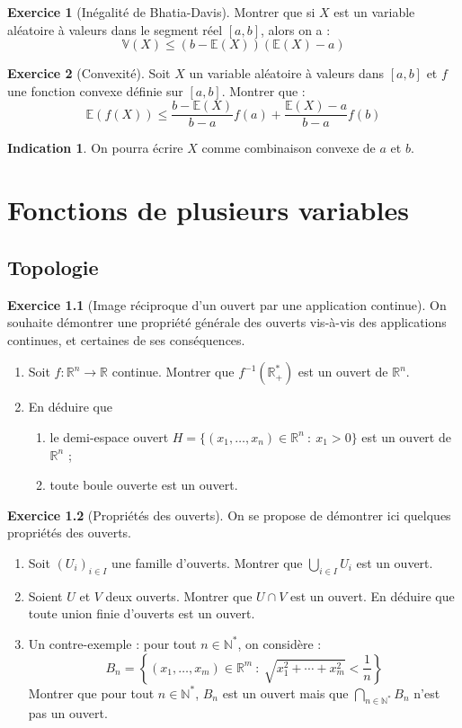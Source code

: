 \documentclass[french]{book}
\newcommand{\N}{\mathbb{N}}
\newcommand{\R}{\mathbb{R}}
\newcommand{\st}{^*}
\newcommand{\inv}{^{-1}}
\newcommand{\E}{\mathbb{E}}
\newcommand{\V}{\mathbb{V}}
\theoremstyle{definition}
\newtheorem{ex}{Exercice}[chapter]
\theoremstyle{theorem}
\newtheorem*{ind}{Indication}
\theoremstyle{remark}
\begin{document}
\begin{ex}[Inégalité de Bhatia-Davis]
	Montrer que si $X$ est un variable aléatoire à valeurs dans le segment réel $[a,b]$, alors on a : $$\V(X)\leqslant (b-\E(X))(\E(X)-a)$$
\end{ex}

\begin{ex}[Convexité]
	Soit $X$ un variable aléatoire à valeurs dans $[a,b]$ et $f$ une fonction convexe définie sur $[a,b]$. Montrer que : $$\E(f(X))\leqslant\frac{b-\E(X)}{b-a}f(a)+\frac{\E(X)-a}{b-a}f(b)$$ \begin{ind}
		On pourra écrire $X$ comme combinaison convexe de $a$ et $b$.
	\end{ind}
\end{ex}



\chapter{Fonctions de plusieurs variables}

\section{Topologie}

\begin{ex}[Image réciproque d'un ouvert par une application continue]
	On souhaite démontrer une propriété générale des ouverts vis-à-vis des applications continues, et certaines de ses conséquences.
	\begin{enumerate}
		\item Soit $f:\R^n\to\R$ continue. Montrer que $f\inv(\R_+\st)$ est un ouvert de $\R^n$.
		\item En déduire que 
		\begin{enumerate}[label=\alph*.]
			\item le demi-espace ouvert $H=\{(x_1,\ldots,x_n)\in\R^n\ : \ x_1>0\}$ est un ouvert de $\R^n$ ; 
			\item toute boule ouverte est un ouvert.
		\end{enumerate}
	\end{enumerate}
\end{ex}

\begin{ex}[Propriétés des ouverts]
	On se propose de démontrer ici quelques propriétés des ouverts.
	\begin{enumerate}
		\item Soit $(U_i)_{i\in I}$ une famille d'ouverts. Montrer que $\displaystyle\bigcup_{i\in I} U_i$ est un ouvert.
		\item Soient $U$ et $V$ deux ouverts. Montrer que $U\cap V$ est un ouvert. En déduire que toute union finie d'ouverts est un ouvert.
		\item Un contre-exemple : pour tout $n\in\N\st$, on considère : $$B_n=\left\{(x_1,\ldots,x_m)\in\R^m\ : \ \sqrt{x_1^2+\cdots+x_m^2}<\frac{1}{n}\right\}$$ Montrer que pour tout $n\in\N\st$, $B_n$ est un ouvert mais que $\displaystyle\bigcap_{n\in\N\st}B_n$ n'est pas un ouvert.
	\end{enumerate}
\end{ex}
\end{document}
